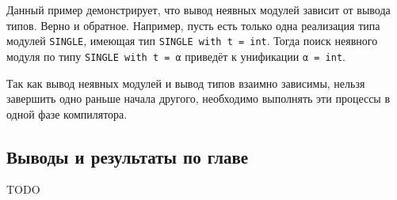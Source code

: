 \documentclass[../diploma.tex]{subfiles}
\begin{document}
Данный пример демонстрирует, что вывод неявных модулей зависит от вывода типов. Верно и обратное. Например, пусть есть только одна реализация типа модулей \texttt{SINGLE}, имеющая тип \texttt{SINGLE with t = int}. Тогда поиск неявного модуля по типу \texttt{SINGLE with t = α} приведёт к унификации \texttt{α = int}.

Так как вывод неявных модулей и вывод типов взаимно зависимы, нельзя завершить одно раньше начала другого, необходимо выполнять эти процессы в одной фазе компилятора. 

\subsection{Выводы и результаты по главе}

TODO
\end{document}
